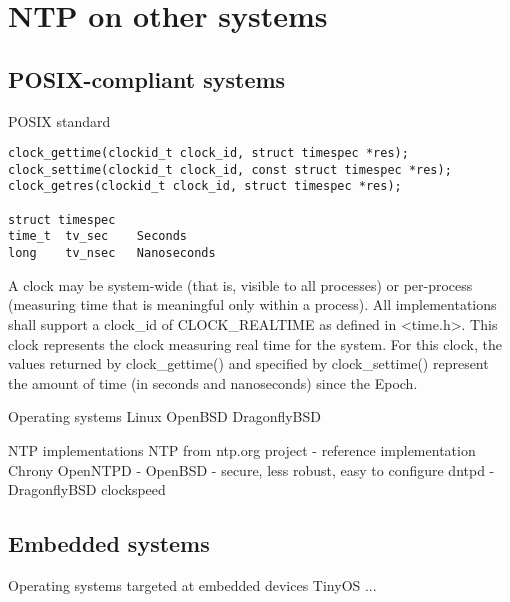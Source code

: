 
\chapter{NTP on other systems}

\section{POSIX-compliant systems}
POSIX standard
\begin{lstlisting}[morekeywords={clockid_t,time_t},numbers=none]
clock_gettime(clockid_t clock_id, struct timespec *res);
clock_settime(clockid_t clock_id, const struct timespec *res);
clock_getres(clockid_t clock_id, struct timespec *res);

struct timespec
time_t  tv_sec    Seconds
long    tv_nsec   Nanoseconds
\end{lstlisting}
A clock may be system-wide (that is, visible to all processes)
or per-process (measuring time that is meaningful only within a process).
All implementations shall support a clock\_id of CLOCK\_REALTIME as
defined in <time.h>.
This clock represents the clock measuring real time for the system.
For this clock, the values returned by clock\_gettime() and specified
by clock\_settime() represent the amount
of time (in seconds and nanoseconds) since the Epoch.


Operating systems
Linux
OpenBSD
DragonflyBSD

NTP implementations
NTP from ntp.org project - reference implementation
Chrony
OpenNTPD - OpenBSD - secure, less robust, easy to configure
dntpd - DragonflyBSD
clockspeed

\section{Embedded systems}
Operating systems targeted at embedded devices
TinyOS
...
